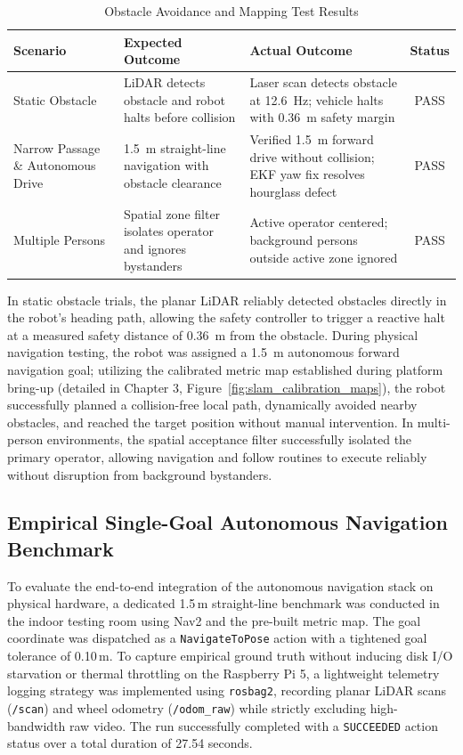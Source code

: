 \begin{table}[H]
\centering
\caption{Obstacle Avoidance and Mapping Test Results}
\label{tab:obstacle_avoidance}
\begin{tabular}{|l|p{5.5cm}|p{5.5cm}|c|}
\hline
\textbf{Scenario} & \textbf{Expected Outcome} & \textbf{Actual Outcome} & \textbf{Status} \\
\hline
Static Obstacle & LiDAR detects obstacle and robot halts before collision & Laser scan detects obstacle at 12.6~Hz; vehicle halts with 0.36~m safety margin & PASS \\
\hline
Narrow Passage \& Autonomous Drive & 1.5~m straight-line navigation with obstacle clearance & Verified 1.5~m forward drive without collision; EKF yaw fix resolves hourglass defect & PASS \\
\hline
Multiple Persons & Spatial zone filter isolates operator and ignores bystanders & Active operator centered; background persons outside active zone ignored & PASS \\
\hline
\end{tabular}
\end{table}

In static obstacle trials, the planar LiDAR reliably detected obstacles directly in the robot's heading path, allowing the safety controller to trigger a reactive halt at a measured safety distance of 0.36~m from the obstacle. During physical navigation testing, the robot was assigned a 1.5~m autonomous forward navigation goal; utilizing the calibrated metric map established during platform bring-up (detailed in Chapter 3, Figure~\ref{fig:slam_calibration_maps}), the robot successfully planned a collision-free local path, dynamically avoided nearby obstacles, and reached the target position without manual intervention. In multi-person environments, the spatial acceptance filter successfully isolated the primary operator, allowing navigation and follow routines to execute reliably without disruption from background bystanders.

\subsection{Empirical Single-Goal Autonomous Navigation Benchmark}
\label{sec:nav2_evaluation}
To evaluate the end-to-end integration of the autonomous navigation stack on physical hardware, a dedicated 1.5\,m straight-line benchmark was conducted in the indoor testing room using Nav2 and the pre-built metric map. The goal coordinate was dispatched as a \texttt{NavigateToPose} action with a tightened goal tolerance of 0.10\,m. To capture empirical ground truth without inducing disk I/O starvation or thermal throttling on the Raspberry Pi 5, a lightweight telemetry logging strategy was implemented using \texttt{rosbag2}, recording planar LiDAR scans (\texttt{/scan}) and wheel odometry (\texttt{/odom\_raw}) while strictly excluding high-bandwidth raw video. The run successfully completed with a \texttt{SUCCEEDED} action status over a total duration of 27.54 seconds.

